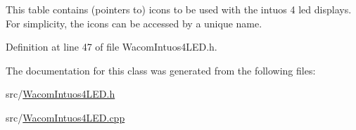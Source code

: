 This table contains (pointers to) icons to be used with the intuos 4 led displays. For simplicity, the icons can be accessed by a unique name. 

Definition at line 47 of file WacomIntuos4LED.h.



The documentation for this class was generated from the following files:\begin{DoxyCompactItemize}
\item 
src/\hyperlink{WacomIntuos4LED_8h}{WacomIntuos4LED.h}\item 
src/\hyperlink{WacomIntuos4LED_8cpp}{WacomIntuos4LED.cpp}\end{DoxyCompactItemize}
